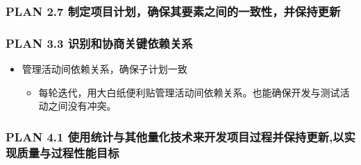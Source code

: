 \hypertarget{plan-2.7-ux5236ux5b9aux9879ux76eeux8ba1ux5212ux786eux4fddux5176ux8981ux7d20ux4e4bux95f4ux7684ux4e00ux81f4ux6027ux5e76ux4fddux6301ux66f4ux65b0}{%
\subsubsection{PLAN 2.7
制定项目计划，确保其要素之间的一致性，并保持更新}\label{plan-2.7-ux5236ux5b9aux9879ux76eeux8ba1ux5212ux786eux4fddux5176ux8981ux7d20ux4e4bux95f4ux7684ux4e00ux81f4ux6027ux5e76ux4fddux6301ux66f4ux65b0}}

\hypertarget{plan-3.3-ux8bc6ux522bux548cux534fux5546ux5173ux952eux4f9dux8d56ux5173ux7cfb}{%
\subsubsection{PLAN 3.3
识别和协商关键依赖关系}\label{plan-3.3-ux8bc6ux522bux548cux534fux5546ux5173ux952eux4f9dux8d56ux5173ux7cfb}}

\begin{itemize}
\tightlist
\item
  管理活动间依赖关系，确保子计划一致

  \begin{itemize}
  \tightlist
  \item
    每轮迭代，用大白纸便利贴管理活动间依赖关系。也能确保开发与测试活动之间没有冲突。
  \end{itemize}
\end{itemize}

\hypertarget{plan-4.1-ux4f7fux7528ux7edfux8ba1ux4e0eux5176ux4ed6ux91cfux5316ux6280ux672fux6765ux5f00ux53d1ux9879ux76eeux8fc7ux7a0bux5e76ux4fddux6301ux66f4ux65b0ux4ee5ux5b9eux73b0ux8d28ux91cfux4e0eux8fc7ux7a0bux6027ux80fdux76eeux6807}{%
\subsubsection{PLAN 4.1
使用统计与其他量化技术来开发项目过程并保持更新,以实现质量与过程性能目标}\label{plan-4.1-ux4f7fux7528ux7edfux8ba1ux4e0eux5176ux4ed6ux91cfux5316ux6280ux672fux6765ux5f00ux53d1ux9879ux76eeux8fc7ux7a0bux5e76ux4fddux6301ux66f4ux65b0ux4ee5ux5b9eux73b0ux8d28ux91cfux4e0eux8fc7ux7a0bux6027ux80fdux76eeux6807}}

